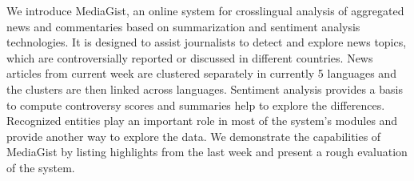 We introduce MediaGist, an online system for crosslingual analysis of aggregated news and commentaries based on summarization and sentiment analysis technologies. It is designed to assist journalists to detect and explore news topics, which are controversially reported or discussed in different countries. News articles from current week are clustered separately in currently 5 languages and the clusters are then linked across languages. Sentiment analysis provides a basis to compute controversy scores and summaries help to explore the differences. Recognized entities play an important role in most of the system's modules and provide another way to explore the data. We demonstrate the capabilities of MediaGist by listing highlights from the last week and present a rough evaluation of the system.
